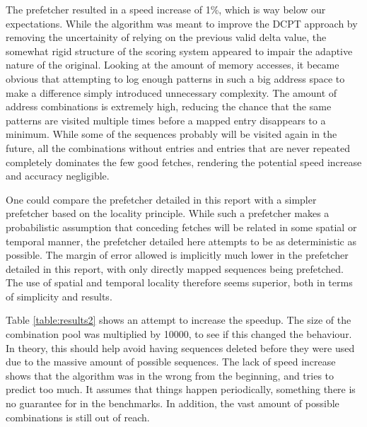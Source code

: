 The prefetcher resulted in a speed increase of 1\%, which is way below our expectations. While the algorithm was meant to improve the DCPT approach by removing the uncertainity of relying on the previous valid delta value, the somewhat rigid structure of the scoring system appeared to impair the adaptive nature of the original. Looking at the amount of memory accesses, it became obvious that attempting to log enough patterns in such a big address space to make a difference simply introduced unnecessary complexity. The amount of address combinations is extremely high, reducing the chance that the same patterns are visited multiple times before a mapped entry disappears to a minimum. While some of the sequences probably will be visited again in the future, all the combinations without entries and entries that are never repeated completely dominates the few good fetches, rendering the potential speed increase and accuracy negligible. 

One could compare the prefetcher detailed in this report with a simpler prefetcher based on the locality principle. While such a prefetcher makes a probabilistic assumption that conceding fetches will be related in some spatial or temporal manner, the prefetcher detailed here attempts to be as deterministic as possible. The margin of error allowed is implicitly much lower in the prefetcher detailed in this report, with only directly mapped sequences being prefetched. The use of spatial and temporal locality therefore seems superior, both in terms of simplicity and results.


Table \ref{table:results2} shows an attempt to increase the speedup. The size of the combination pool was multiplied by 10000, to see if this changed the behaviour. In theory, this should help avoid having sequences deleted before they were used due to the massive amount of possible sequences. The lack of speed increase shows that the algorithm was in the wrong from the beginning, and tries to predict too much. It assumes that things happen periodically, something there is no guarantee for in the benchmarks. In addition, the vast amount of possible combinations is still out of reach.

